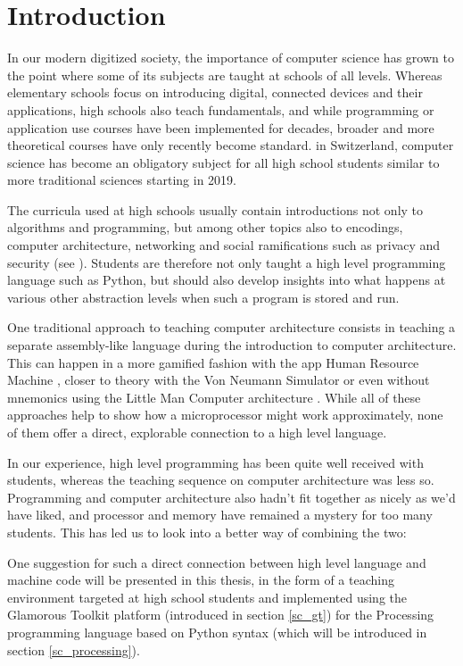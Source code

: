 
\chapter{Introduction}

In our modern digitized society, the importance of computer science has grown to the point where some of its subjects are taught at schools of all levels. Whereas elementary schools focus on introducing digital, connected devices and their applications, high schools also teach fundamentals, and while programming or application use courses have been implemented for decades, broader and more theoretical courses have only recently become standard. \eg in Switzerland, computer science has become an obligatory subject for all high school students similar to more traditional sciences starting in 2019.

The curricula used at high schools usually contain introductions not only to algorithms and programming, but among other topics also to encodings, computer architecture, networking and social ramifications such as privacy and security (see \eg \cite{Erz16}). Students are therefore not only taught a high level programming language such as Python, but should also develop insights into what happens at various other abstraction levels when such a program is stored and run.

One traditional approach to teaching computer architecture consists in teaching a separate assembly-like language during the introduction to computer architecture. This can happen in a more gamified fashion \eg with the app Human Resource Machine \cite{Tom15}, closer to theory with the Von Neumann Simulator \cite{Gan23} or even without mnemonics using the Little Man Computer architecture \cite{Oin25}. While all of these approaches help to show how a microprocessor might work approximately, none of them offer a direct, explorable connection to a high level language.

In our experience, high level programming has been quite well received with students, whereas the teaching sequence on computer architecture was less so. Programming and computer architecture also hadn't fit together as nicely as we'd have liked, and processor and memory have remained a mystery for too many students. This has led us to look into a better way of combining the two:

One suggestion for such a direct connection between high level language and machine code will be presented in this thesis, in the form of a teaching environment targeted at high school students and implemented using the Glamorous Toolkit platform (introduced in section \ref{sc_gt}) for the Processing programming language based on Python syntax (which will be introduced in section \ref{sc_processing}).

